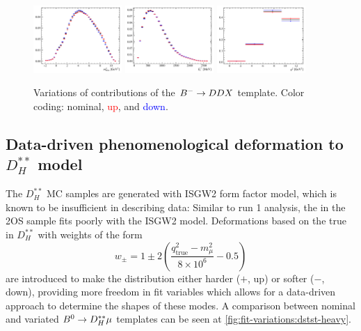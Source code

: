 \begin{figure}[!htb]
    \centering
    \includegraphics[width=0.3\textwidth]{./figs-fit-fit-variations/histo-var/D0_iso_uDDMu__vs__D0_iso_uDDMu_kst_m__vs__D0_iso_uDDMu_kst_p__m2miss.pdf}
    \includegraphics[width=0.3\textwidth]{./figs-fit-fit-variations/histo-var/D0_iso_uDDMu__vs__D0_iso_uDDMu_kst_m__vs__D0_iso_uDDMu_kst_p__el.pdf}
    \includegraphics[width=0.3\textwidth]{./figs-fit-fit-variations/histo-var/D0_iso_uDDMu__vs__D0_iso_uDDMu_kst_m__vs__D0_iso_uDDMu_kst_p__q2.pdf}

    \caption{
        Variations of \Kstar contributions of the
        ${{{B}^-}} \rightarrow DDX$ template.
        Color coding: nominal, \textcolor{red}{up}, and \textcolor{blue}{down}.
    }
    \label{fig:fit-variations:ddx-kst}
\end{figure}


\subsection{Data-driven phenomenological deformation to $D_H^{**}$ model}

The $D_H^{**}$ MC samples are generated with ISGW2 form factor model, which
is known to be insufficient in describing data:
Similar to run 1 analysis, the \qSq in the 2OS sample fits poorly with the ISGW2
model.
Deformations based on the true \qSq
in $D_H^{**}$ with weights of the form
\begin{equation}
    w_\pm = 1 \pm 2 \left(
            \frac{q^2_\text{true} - m^2_\mu}{8 \times 10^6} - 0.5
        \right)
\end{equation}
are introduced to make the \qSq distribution either harder ($+$, up) or
softer ($-$, down),
providing more freedom in fit variables
which allows for a data-driven approach to determine the shapes of these modes.
A comparison between nominal and variated
${{B}^0} \rightarrow D_H^{**}\mu$ templates can be seen at
\cref{fig:fit-variations:dstst-heavy}.

